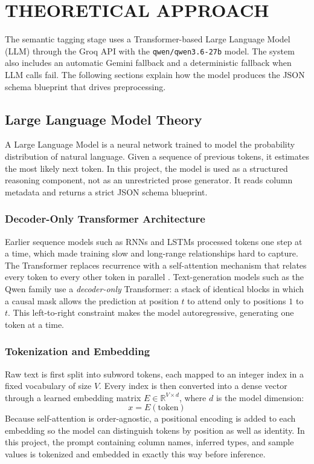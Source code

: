 \documentclass[12pt,a4paper,openany]{report}
\begin{document}
\chapter{THEORETICAL APPROACH}

The semantic tagging stage uses a Transformer-based Large Language Model (LLM) through the Groq API with the \texttt{qwen/qwen3.6-27b} model. The system also includes an automatic Gemini fallback and a deterministic fallback when LLM calls fail. The following sections explain how the model produces the JSON schema blueprint that drives preprocessing.

\section{Large Language Model Theory}

A Large Language Model is a neural network trained to model the probability distribution of natural language. Given a sequence of previous tokens, it estimates the most likely next token. In this project, the model is used as a structured reasoning component, not as an unrestricted prose generator. It reads column metadata and returns a strict JSON schema blueprint.

\subsection{Decoder-Only Transformer Architecture}
Earlier sequence models such as RNNs and LSTMs processed tokens one step at a time, which made training slow and long-range relationships hard to capture. The Transformer replaces recurrence with a self-attention mechanism that relates every token to every other token in parallel \cite{vaswani2017}. Text-generation models such as the Qwen family use a \emph{decoder-only} Transformer: a stack of identical blocks in which a causal mask allows the prediction at position $t$ to attend only to positions $1$ to $t$. This left-to-right constraint makes the model autoregressive, generating one token at a time.

\subsection{Tokenization and Embedding}
Raw text is first split into subword tokens, each mapped to an integer index in a fixed vocabulary of size $V$. Every index is then converted into a dense vector through a learned embedding matrix $E \in \mathbb{R}^{V \times d}$, where $d$ is the model dimension:
\begin{equation}
x = E(\text{token})
\label{eq:embed}
\end{equation}
Because self-attention is order-agnostic, a positional encoding is added to each embedding so the model can distinguish tokens by position as well as identity. In this project, the prompt containing column names, inferred types, and sample values is tokenized and embedded in exactly this way before inference.
\end{document}
